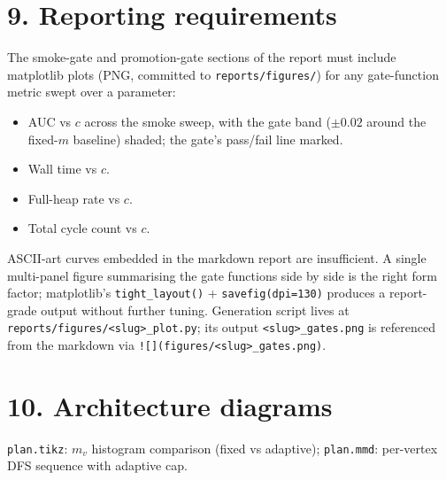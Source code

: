 \documentclass[a4paper,11pt]{article}
\begin{document}
\section*{9. Reporting requirements}

The smoke-gate and promotion-gate sections of the report must
include matplotlib plots (PNG, committed to
\texttt{reports/figures/}) for any gate-function metric swept over
a parameter:

\begin{itemize}
  \item AUC vs $c$ across the smoke sweep, with the gate band
    ($\pm 0.02$ around the fixed-$m$ baseline) shaded; the gate's
    pass/fail line marked.
  \item Wall time vs $c$.
  \item Full-heap rate vs $c$.
  \item Total cycle count vs $c$.
\end{itemize}

ASCII-art curves embedded in the markdown report are insufficient.
A single multi-panel figure summarising the gate functions side by
side is the right form factor; matplotlib's
\texttt{tight\_layout()} + \texttt{savefig(dpi=130)} produces a
report-grade output without further tuning.  Generation script
lives at \texttt{reports/figures/<slug>\_plot.py}; its output
\texttt{<slug>\_gates.png} is referenced from the markdown via
\texttt{![](figures/<slug>\_gates.png)}.

\section*{10. Architecture diagrams}

\texttt{plan.tikz}: $m_v$ histogram comparison (fixed vs adaptive);
\texttt{plan.mmd}: per-vertex DFS sequence with adaptive cap.

\begin{center}

\end{center}
\end{document}
